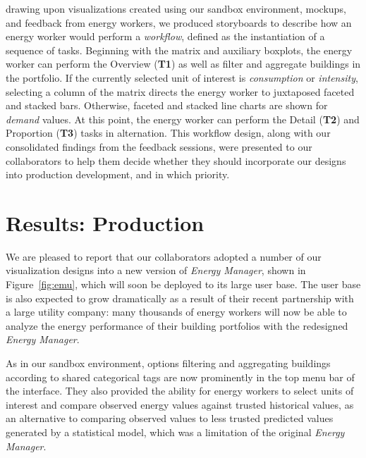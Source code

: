 \documentclass[journal]{vgtc}                %
\newcommand{\bstart}[1]{\vspace{1mm} \noindent{\textbf{#1:}}}
\newcommand{\tm}[1]{\textcolor{red}{#1}}
\begin{document}
\bstart{Interactive workflow design} drawing upon visualizations created using our sandbox environment, mockups, and feedback from energy workers, we produced storyboards to describe how an energy worker would perform a {\it workflow}, defined as the instantiation of a sequence of tasks. 
Beginning with the matrix and auxiliary boxplots, the energy worker can perform the Overview ({\bf T1}) as well as filter and aggregate buildings in the portfolio. 
If the currently selected unit of interest is {\it consumption} or {\it intensity}, selecting a column of the matrix directs the energy worker to juxtaposed faceted and stacked bars. 
Otherwise, faceted and stacked line charts are shown for {\it demand} values.
At this point, the energy worker can perform the Detail ({\bf T2}) and Proportion ({\bf T3}) tasks in alternation.
This workflow design, along with our consolidated findings from the feedback sessions, were presented to our collaborators to help them decide whether they should incorporate our designs into production development, and in which priority.


\section{Results: Production}
\label{production}


We are pleased to report that our collaborators adopted a number of our visualization designs into a new version of {\it Energy Manager}, shown in Figure~\ref{fig:emu}, which will soon be deployed to its large user base.
The user base is also expected to grow dramatically as a result of their recent partnership with a large utility company: many thousands of energy workers will now be able to analyze the energy performance of their building portfolios with the redesigned {\it Energy Manager}.

As in our sandbox environment, options filtering and aggregating buildings according to shared categorical tags are now prominently in the top menu bar of the interface. 
They also provided the ability for energy workers to select units of interest and compare observed energy values against trusted historical values, as an alternative to comparing observed values to less trusted predicted values generated by a statistical model, which was a limitation of the original {\it Energy Manager}.
\end{document}
